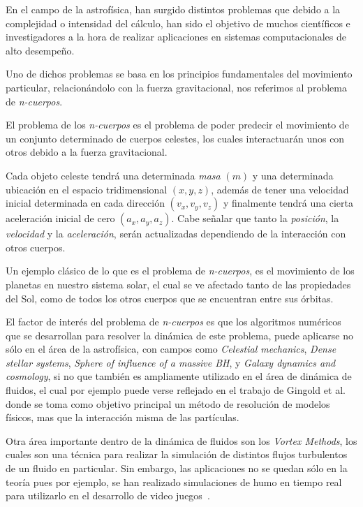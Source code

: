 En el campo de la astrofísica,
han surgido distintos problemas que debido a la complejidad
o intensidad del cálculo, han sido el objetivo de muchos
científicos e investigadores a la hora de realizar
aplicaciones en sistemas computacionales de alto desempeño.

Uno de dichos problemas se basa en los principios
fundamentales del movimiento particular, relacionándolo con
la fuerza gravitacional, nos referimos al problema de \emph{n-cuerpos}.

El problema de los \emph{n-cuerpos} es el problema de poder
predecir el movimiento de un conjunto determinado de cuerpos celestes,
los cuales interactuarán unos con otros debido a la fuerza
gravitacional.

Cada objeto celeste tendrá una determinada \emph{masa} $(m)$
y una determinada ubicación en el espacio
tridimensional $(x,y,z)$, además de tener una velocidad inicial
determinada en cada dirección $(v_{x},v_{y},v_{z})$ y finalmente
tendrá una cierta aceleración inicial de cero $(a_{x},a_{y},a_{z})$.
Cabe señalar que tanto la \emph{posición}, la \emph{velocidad} y la \emph{aceleración},
serán actualizadas dependiendo de la interacción con otros cuerpos.

Un ejemplo clásico de lo que es el problema de \emph{n-cuerpos},
es el movimiento de los planetas en nuestro sistema solar,
el cual se ve afectado tanto de las propiedades del Sol,
como de todos los otros cuerpos que se encuentran entre sus órbitas.

El factor de interés del problema de \emph{n-cuerpos}
es que los algoritmos numéricos que se desarrollan para resolver
la dinámica de este problema, puede aplicarse no sólo en el área de la astrofísica,
con campos como \emph{Celestial mechanics}, \emph{Dense stellar systems},
\emph{Sphere of influence of a massive BH}, y \emph{Galaxy dynamics and cosmology},
si no que también es ampliamente utilizado en el área de dinámica de fluidos,
el cual por  ejemplo puede verse reflejado en el trabajo de Gingold et al.~\cite{gingold}
donde se toma como objetivo principal un método de resolución de modelos físicos,
mas que la interacción misma de las partículas.

Otra área importante dentro de la dinámica de fluidos son los \emph{Vortex Methods},
los cuales son una técnica para realizar la simulación de distintos flujos turbulentos
de un fluido en particular. Sin embargo, las aplicaciones no se quedan sólo en la teoría
pues por ejemplo, se han realizado simulaciones de humo en tiempo real
para utilizarlo en el desarrollo de video juegos~\cite{gourlay}.

